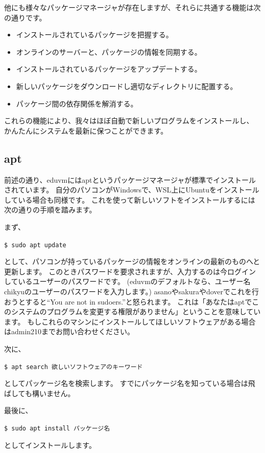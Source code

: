\documentclass[a4j]{ltjsreport}
\begin{document}
    他にも様々なパッケージマネージャが存在しますが、それらに共通する機能は次の通りです。
    \begin{itemize}
        \item インストールされているパッケージを把握する。
        \item オンラインのサーバーと、パッケージの情報を同期する。
        \item インストールされているパッケージをアップデートする。
        \item 新しいパッケージをダウンロードし適切なディレクトリに配置する。
        \item パッケージ間の依存関係を解消する。
    \end{itemize}

    これらの機能により、我々はほぼ自動で新しいプログラムをインストールし、
    かんたんにシステムを最新に保つことができます。

    \subsection{apt}
    前述の通り、eduvmにはaptというパッケージマネージャが標準でインストールされています。
    自分のパソコンがWindowsで、WSL上にUbuntuをインストールしている場合も同様です。
    これを使って新しいソフトをインストールするには次の通りの手順を踏みます。

    まず、
    \begin{screen}
        \texttt{\$ sudo apt update}
    \end{screen}
    として、パソコンが持っているパッケージの情報をオンラインの最新のものへと更新します。
    このときパスワードを要求されますが、入力するのは今ログインしているユーザーのパスワードです。
    (eduvmのデフォルトなら、ユーザー名chikyuのユーザーのパスワードを入力します。)
    asanoやsakuraやdoverでこれを行おうとすると``You are not in sudoers.''と怒られます。
    これは「あなたはaptでこのシステムのプログラムを変更する権限がありません」ということを意味しています。
    もしこれらのマシンにインストールしてほしいソフトウェアがある場合はadmin210までお問い合わせください。

    次に、
    \begin{screen}
        \texttt{\$ apt search 欲しいソフトウェアのキーワード}
    \end{screen}
    としてパッケージ名を検索します。
    すでにパッケージ名を知っている場合は飛ばしても構いません。

    最後に、
    \begin{screen}
        \texttt{\$ sudo apt install パッケージ名}
    \end{screen}
    としてインストールします。
\end{document}
